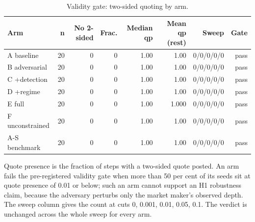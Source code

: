 \begin{table}[htbp]
  \centering
  \caption{Validity gate: two-sided quoting by arm.}
  \label{tab:validity}
  \begin{tabular}{lrrrrrrr}
    \toprule
    Arm & n & No 2-sided & Frac. & Median qp & Mean qp (rest) & Sweep & Gate \\
    \midrule
    A  baseline & 20 & 0 & 0 & 1.00 & 1.00 & 0/0/0/0/0 & pass \\
    B  adversarial & 20 & 0 & 0 & 1.00 & 1.00 & 0/0/0/0/0 & pass \\
    C  +detection & 20 & 0 & 0 & 1.00 & 1.00 & 0/0/0/0/0 & pass \\
    D  +regime & 20 & 0 & 0 & 1.00 & 1.00 & 0/0/0/0/0 & pass \\
    E  full & 20 & 0 & 0 & 1.00 & 1.000 & 0/0/0/0/0 & pass \\
    F  unconstrained & 20 & 0 & 0 & 1.00 & 1.00 & 0/0/0/0/0 & pass \\
    A-S benchmark & 20 & 0 & 0 & 1.00 & 1.00 & 0/0/0/0/0 & pass \\
    \bottomrule
  \end{tabular}
  \begin{minipage}{\linewidth}\vspace{4pt}\footnotesize Quote presence is the fraction of steps with a two-sided quote posted. An arm fails the pre-registered validity gate when more than 50 per cent of its seeds sit at quote presence of 0.01 or below; such an arm cannot support an H1 robustness claim, because the adversary perturbs only the market maker's observed depth. The sweep column gives the count at cuts 0, 0.001, 0.01, 0.05, 0.1. The verdict is unchanged across the whole sweep for every arm.\end{minipage}
\end{table}
